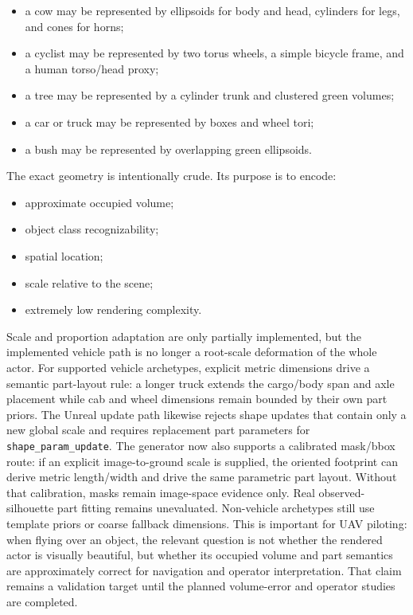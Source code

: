 ﻿\documentclass[11pt,a4paper]{article}
\begin{document}
\begin{itemize}
    \item a cow may be represented by ellipsoids for body and head, cylinders
    for legs, and cones for horns;
    \item a cyclist may be represented by two torus wheels, a simple bicycle
    frame, and a human torso/head proxy;
    \item a tree may be represented by a cylinder trunk and clustered green
    volumes;
    \item a car or truck may be represented by boxes and wheel tori;
    \item a bush may be represented by overlapping green ellipsoids.
\end{itemize}

The exact geometry is intentionally crude. Its purpose is to encode:

\begin{itemize}
    \item approximate occupied volume;
    \item object class recognizability;
    \item spatial location;
    \item scale relative to the scene;
    \item extremely low rendering complexity.
\end{itemize}

Scale and proportion adaptation are only partially implemented, but the
implemented vehicle path is no longer a root-scale deformation of the whole
actor. For supported vehicle archetypes, explicit metric dimensions drive a
semantic part-layout rule: a longer truck extends the cargo/body span and axle
placement while cab and wheel dimensions remain bounded by their own part
priors. The Unreal update path likewise rejects shape updates that contain only
a new global scale and requires replacement part parameters for
\texttt{shape\_param\_update}. The generator now also supports a calibrated
mask/bbox route: if an explicit image-to-ground scale is supplied, the oriented
footprint can derive metric length/width and drive the same parametric part
layout. Without that calibration, masks remain image-space evidence only.
Real observed-silhouette part fitting remains unevaluated. Non-vehicle
archetypes still use template priors or coarse fallback dimensions. This is
important for UAV piloting: when flying over an object, the relevant question
is not whether the rendered actor is visually beautiful, but whether its
occupied volume and part semantics are approximately correct for navigation and
operator interpretation. That claim remains a validation target until the
planned volume-error and operator studies are completed.
\end{document}
